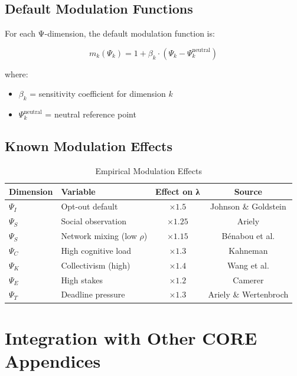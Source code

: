 \subsection{Default Modulation Functions}

For each Ψ-dimension, the default modulation function is:

\begin{equation}
m_k(\Psi_k) = 1 + \beta_k \cdot (\Psi_k - \Psi_k^{\text{neutral}})
\end{equation}

where:
\begin{itemize}
\item $\beta_k$ = sensitivity coefficient for dimension $k$
\item $\Psi_k^{\text{neutral}}$ = neutral reference point
\end{itemize}

\subsection{Known Modulation Effects}

\begin{table}[htbp]
\centering
\caption{Empirical Modulation Effects}
\label{tab:when-effects}
\renewcommand{\arraystretch}{1.3}
\begin{tabular}{@{}llcc@{}}
\toprule
\textbf{Dimension} & \textbf{Variable} & \textbf{Effect on λ} & \textbf{Source} \\
\midrule
$\Psi_I$ & Opt-out default & $\times 1.5$ & Johnson \& Goldstein \\
$\Psi_S$ & Social observation & $\times 1.25$ & Ariely \\
$\Psi_S$ & Network mixing (low $\rho$) & $\times 1.15$ & Bénabou et al. \\
$\Psi_C$ & High cognitive load & $\times 1.3$ & Kahneman \\
$\Psi_K$ & Collectivism (high) & $\times 1.4$ & Wang et al. \\
$\Psi_E$ & High stakes & $\times 1.2$ & Camerer \\
$\Psi_T$ & Deadline pressure & $\times 1.3$ & Ariely \& Wertenbroch \\
\bottomrule
\end{tabular}
\end{table}


\section{Integration with Other CORE Appendices}
\label{sec:when-integration}

